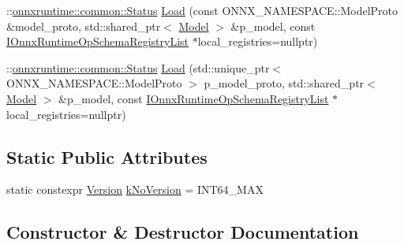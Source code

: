 \begin{DoxyCompactItemize}
\item 
\+::\mbox{\hyperlink{classonnxruntime_1_1common_1_1Status}{onnxruntime\+::common\+::\+Status}} \mbox{\hyperlink{classonnxruntime_1_1Model_a61473df4c76c5914c712737804f8c79d}{Load}} (const O\+N\+N\+X\+\_\+\+N\+A\+M\+E\+S\+P\+A\+C\+E\+::\+Model\+Proto \&model\+\_\+proto, std\+::shared\+\_\+ptr$<$ \mbox{\hyperlink{classonnxruntime_1_1Model}{Model}} $>$ \&p\+\_\+model, const \mbox{\hyperlink{namespaceonnxruntime_a37a91305e7190e83fa9c66117a6a4746}{I\+Onnx\+Runtime\+Op\+Schema\+Registry\+List}} $\ast$local\+\_\+registries=nullptr)
\item 
\+::\mbox{\hyperlink{classonnxruntime_1_1common_1_1Status}{onnxruntime\+::common\+::\+Status}} \mbox{\hyperlink{classonnxruntime_1_1Model_ac3349b0c44c0adacf291f6ea79abf210}{Load}} (std\+::unique\+\_\+ptr$<$ O\+N\+N\+X\+\_\+\+N\+A\+M\+E\+S\+P\+A\+C\+E\+::\+Model\+Proto $>$ p\+\_\+model\+\_\+proto, std\+::shared\+\_\+ptr$<$ \mbox{\hyperlink{classonnxruntime_1_1Model}{Model}} $>$ \&p\+\_\+model, const \mbox{\hyperlink{namespaceonnxruntime_a37a91305e7190e83fa9c66117a6a4746}{I\+Onnx\+Runtime\+Op\+Schema\+Registry\+List}} $\ast$local\+\_\+registries=nullptr)
\end{DoxyCompactItemize}
\subsection*{Static Public Attributes}
\begin{DoxyCompactItemize}
\item 
static constexpr \mbox{\hyperlink{namespaceonnxruntime_ab7fae8d5830807c074def3bb8ae23cf1}{Version}} \mbox{\hyperlink{classonnxruntime_1_1Model_a092dabe5ac2981fde3b0ad0875f1c0c3}{k\+No\+Version}} = I\+N\+T64\+\_\+\+M\+AX
\end{DoxyCompactItemize}


\subsection{Constructor \& Destructor Documentation}
\mbox{\label{classonnxruntime_1_1Model_ae48985db0bd8ad5e58cc5a6693596a7e}} 
